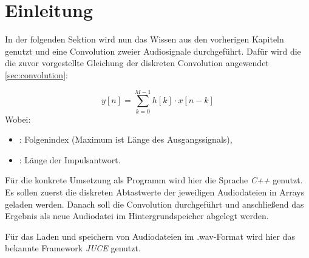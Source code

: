 \section{Einleitung}
\label{sec:introimpl}

In der folgenden Sektion wird nun das Wissen aus den vorherigen Kapiteln genutzt und
eine Convolution zweier Audiosignale durchgeführt.
Dafür wird die die zuvor vorgestellte Gleichung der diskreten Convolution
angewendet \ref{sec:convolution}:

\begin{equation}
    y[n] = \sum_{k=0}^{M-1}h[k] \cdot x[n-k]
    \label{eq:directConv}
\end{equation}
Wobei:
\begin{itemize}
    \item[$n$]: Folgenindex (Maximum ist Länge des Ausgangssignals),
    \item[$M$]: Länge der Impulsantwort.
\end{itemize}

Für die konkrete Umsetzung als Programm wird hier die Sprache \textit{C++} genutzt.
Es sollen zuerst die diskreten Abtastwerte der jeweiligen Audiodateien in Arrays
geladen werden. Danach soll die Convolution durchgeführt und anschließend das Ergebnis als neue
Audiodatei im Hintergrundspeicher abgelegt werden.

Für das Laden und speichern von Audiodateien im .wav-Format wird hier das
bekannte Framework \textit{JUCE} genutzt.
